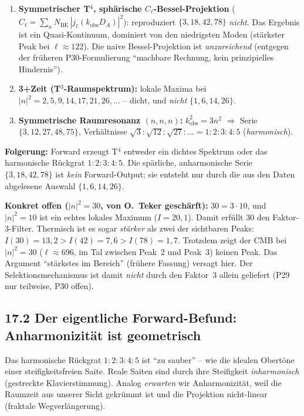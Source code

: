 \begin{enumerate}
  \item \textbf{Symmetrischer T$^4$, sphärische $C_\ell$-Bessel-Projektion}
        ($C_\ell = \sum_n N_\mathrm{BE}\,|j_\ell(k_\mathrm{obs}D_A)|^2$):
        reproduziert $\{3,18,42,78\}$ \emph{nicht}. Das Ergebnis ist ein
        Quasi-Kontinuum, dominiert von den niedrigsten Moden
        (stärkster Peak bei $\ell\approx122$). Die naive Bessel-Projektion
        ist \emph{unzureichend} (entgegen der früheren P30-Formulierung
        ``machbare Rechnung, kein prinzipielles Hindernis'').
  \item \textbf{3+Zeit (T$^3$-Raumspektrum):} lokale Maxima bei
        $|n|^2=2,5,9,14,17,21,26,\ldots$ -- dicht, und \emph{nicht}
        $\{1,6,14,26\}$.
  \item \textbf{Symmetrische Raumresonanz $(n,n,n)$:} $k^2_\mathrm{obs}=3n^2$
        $\Rightarrow$ Serie $\{3,12,27,48,75\}$, Verhältnisse
        $\sqrt{3}:\sqrt{12}:\sqrt{27}:\ldots = 1:2:3:4:5$
        (\emph{harmonisch}).
\end{enumerate}

\textbf{Folgerung:} Forward erzeugt T$^4$ entweder ein dichtes Spektrum
oder das harmonische Rückgrat $1:2:3:4:5$. Die spärliche, anharmonische
Serie $\{3,18,42,78\}$ ist \emph{kein} Forward-Output; sie entsteht nur
durch die aus den Daten abgelesene Auswahl $\{1,6,14,26\}$.

\textbf{Konkret offen ($|n|^2=30$, von O.~Teker geschärft):} $30=3\cdot10$,
und $|n|^2=10$ ist ein echtes lokales Maximum ($I=20{,}1$). Damit erfüllt
$30$ den Faktor-3-Filter. Thermisch ist es sogar \emph{stärker} als zwei
der sichtbaren Peaks: $I(30)=13{,}2 > I(42)=7{,}6 > I(78)=1{,}7$. Trotzdem
zeigt der CMB bei $|n|^2=30$ ($\ell\approx696$, im Tal zwischen Peak~2 und
Peak~3) keinen Peak. Das Argument ``stärkstes im Bereich'' (frühere
Fassung) versagt hier. Der Selektionsmechanismus ist damit \emph{nicht}
durch den Faktor~3 allein geliefert (P29 nur teilweise, P30 offen).

\subsection*{17.2 Der eigentliche Forward-Befund: Anharmonizität ist geometrisch}

Das harmonische Rückgrat $1:2:3:4:5$ ist ``zu sauber'' -- wie die idealen
Obertöne einer steifigkeitsfreien Saite. Reale Saiten sind durch ihre
Steifigkeit \emph{inharmonisch} (gestreckte Klavierstimmung). Analog
\emph{erwarten} wir Anharmonizität, weil die Raumzeit aus unserer Sicht
gekrümmt ist und die Projektion nicht-linear (fraktale Wegverlängerung).

